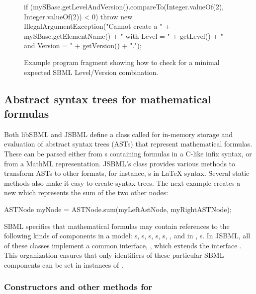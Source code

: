 \begin{figure}[bh]%
  \begin{example}
if (mySBase.getLevelAndVersion().compareTo(Integer.valueOf(2), Integer.valueOf(2)) < 0) {
  throw new IllegalArgumentException("Cannot create a " + mySBase.getElementName() + 
  		" with Level = " + getLevel() + " and Version = " + getVersion() + ".");
}\end{example}
  \caption{Example program fragment showing how to check for a minimal
    expected SBML Level/Version combination.}
  \label{fig:LevelVersionCheck}
\end{figure}


\subsection{Abstract syntax trees for mathematical formulas}

Both libSBML and JSBML define a class called \ASTNode for in-memory storage
and evaluation of abstract syntax trees (ASTs) that represent mathematical
formulas. These can be parsed either from \String{}s containing formulas in a
C-like infix syntax, or from a MathML  representation.  JSBML's
\ASTNode class provides various methods to transform ASTs to other formats,
for instance, s in \LaTeX {} syntax.  Several static methods also
make it easy to create syntax trees.  The next example creates a new
\ASTNode which represents the sum of the two other nodes:

\begin{example}
ASTNode myNode = ASTNode.sum(myLeftAstNode, myRightASTNode);
\end{example}

SBML specifies that mathematical formulas may contain references to the
following kinds of components in a model: \Parameter{}s,
\LocalParameter{}s, \FunctionDefinition{}s, \Reaction{}s, \Compartment{}s,
\Species, and in \SBMLthree, \SpeciesReference{}s.  In JSBML, all of these
classes implement a common interface, \CallableSBase, which extends
the interface \NamedSBaseWithDerivedUnit. This organization ensures that
only identifiers of these particular SBML components can be set in
instances of \ASTNode.


\subsubsection{Constructors and other methods for \CallableSBase}

